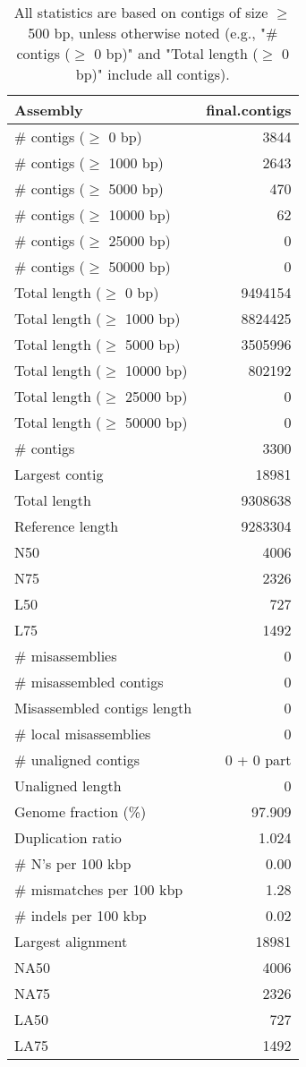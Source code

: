 \documentclass[12pt,a4paper]{article}
\begin{document}
\begin{table}[ht]
\begin{center}
\caption{All statistics are based on contigs of size $\geq$ 500 bp, unless otherwise noted (e.g., "\# contigs ($\geq$ 0 bp)" and "Total length ($\geq$ 0 bp)" include all contigs).}
\begin{tabular}{|l*{1}{|r}|}
\hline
Assembly & final.contigs \\ \hline
\# contigs ($\geq$ 0 bp) & 3844 \\ \hline
\# contigs ($\geq$ 1000 bp) & 2643 \\ \hline
\# contigs ($\geq$ 5000 bp) & 470 \\ \hline
\# contigs ($\geq$ 10000 bp) & 62 \\ \hline
\# contigs ($\geq$ 25000 bp) & 0 \\ \hline
\# contigs ($\geq$ 50000 bp) & 0 \\ \hline
Total length ($\geq$ 0 bp) & 9494154 \\ \hline
Total length ($\geq$ 1000 bp) & 8824425 \\ \hline
Total length ($\geq$ 5000 bp) & 3505996 \\ \hline
Total length ($\geq$ 10000 bp) & 802192 \\ \hline
Total length ($\geq$ 25000 bp) & 0 \\ \hline
Total length ($\geq$ 50000 bp) & 0 \\ \hline
\# contigs & 3300 \\ \hline
Largest contig & 18981 \\ \hline
Total length & 9308638 \\ \hline
Reference length & 9283304 \\ \hline
N50 & 4006 \\ \hline
N75 & 2326 \\ \hline
L50 & 727 \\ \hline
L75 & 1492 \\ \hline
\# misassemblies & 0 \\ \hline
\# misassembled contigs & 0 \\ \hline
Misassembled contigs length & 0 \\ \hline
\# local misassemblies & 0 \\ \hline
\# unaligned contigs & 0 + 0 part \\ \hline
Unaligned length & 0 \\ \hline
Genome fraction (\%) & 97.909 \\ \hline
Duplication ratio & 1.024 \\ \hline
\# N's per 100 kbp & 0.00 \\ \hline
\# mismatches per 100 kbp & 1.28 \\ \hline
\# indels per 100 kbp & 0.02 \\ \hline
Largest alignment & 18981 \\ \hline
NA50 & 4006 \\ \hline
NA75 & 2326 \\ \hline
LA50 & 727 \\ \hline
LA75 & 1492 \\ \hline
\end{tabular}
\end{center}
\end{table}
\end{document}
